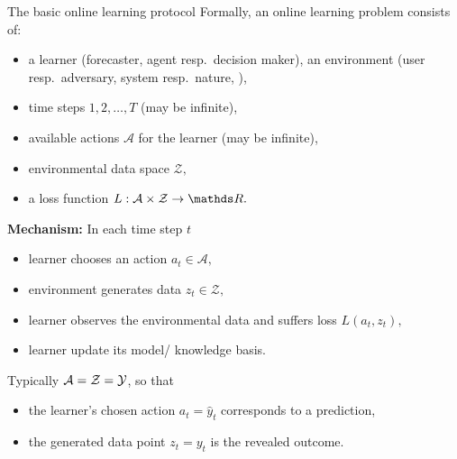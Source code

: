 \documentclass[11pt,compress,t,notes=noshow, xcolor=table]{beamer}
\renewcommand{\l}{L}
\begin{document}
\begin{frame}{The basic online learning protocol}
	\footnotesize
	Formally, an online learning problem consists of:
	\begin{itemize}\footnotesize
		 \item a learner (forecaster, agent resp.\ decision maker), an environment (user resp.\ adversary, system resp.\ nature, ),
		 \item time steps $1,2,\ldots,T$ (may be infinite),
		 \item available actions $\mathcal A$ for the learner (may be infinite),
		 \item environmental data space $\mathcal Z,$
		 \item a loss function $\l: \mathcal{A} \times \mathcal{Z} \to \R.$
	\end{itemize}
	{ {\textbf{Mechanism:} In each time step $t$
	\begin{itemize}\footnotesize
		 \item learner chooses an action $a_{t} \in \mathcal{A},$
		 \item environment generates data $z_{t} \in \mathcal{Z},$
		 \item learner observes the environmental data and suffers loss $\l(a_{t},z_{t}),$ 
		 \item learner update its model/ knowledge basis.
	\end{itemize}}}
	{ {	Typically $\mathcal{A} = \mathcal{Z} = \mathcal{Y}$, so that
	\begin{itemize}\footnotesize
		\item the learner's chosen action $a_{t} = \hat{y}_t$ corresponds to a prediction,
		\item the generated data point $z_{t} =y_t$ is the revealed outcome.
	\end{itemize}}}
\end{frame}
\end{document}

